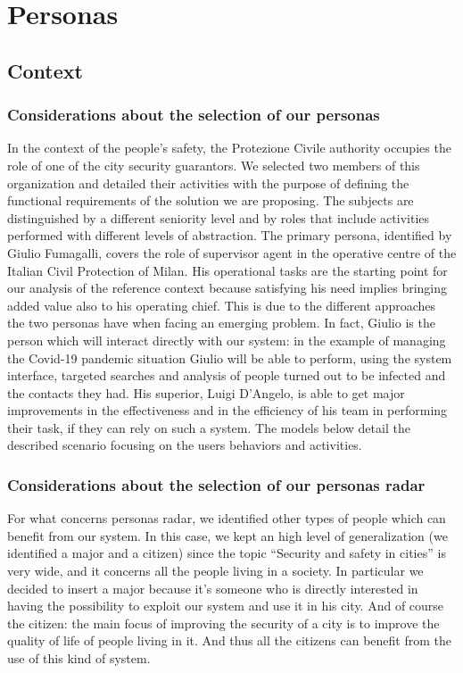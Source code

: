 \documentclass[../main.tex]{subfiles}
\begin{document}
    \chapter{Personas}\label{ch:topic}

    \section{Context}\label{sec:introduction}
    \subsection{Considerations about the selection of our personas}
    In the context of the people’s safety, the Protezione Civile authority occupies the role of one
    of the city security guarantors.
    We selected two members of this organization and detailed their activities with the purpose of
    defining the functional requirements of the solution we are proposing.
    The subjects are distinguished by a different seniority level and by roles that include activities
    performed with different levels of abstraction.
    The primary persona, identified by Giulio Fumagalli, covers the role of supervisor agent
    in the operative centre of the Italian Civil Protection of Milan.
    His operational tasks are the starting point for our analysis of the reference context because
    satisfying his need implies bringing added value also to his operating chief.
    This is due to the different approaches the two personas have when facing an emerging problem.
    In fact, Giulio is the person which will interact directly with our system: in the example of managing
    the Covid-19 pandemic situation Giulio will be able to perform, using the system interface,
    targeted searches and analysis of people turned out to be infected and the contacts they had.
    His superior, Luigi D’Angelo, is able to get major improvements in the effectiveness and in the
    efficiency of his team in performing their task, if they can rely on such a system.
    The models below detail the described scenario focusing on the users behaviors and activities.
    \subsection{Considerations about the selection of our personas radar}
    For what concerns personas radar, we identified other types of people which can benefit from our system.
    In this case, we kept an high level of generalization (we identified a major and a citizen) since
    the topic “Security and safety in cities” is very wide, and it concerns all the people living in a society.
    In particular we decided to insert a major because it’s someone who is directly interested in having the possibility to exploit our system and use it in his city.
    And of course the citizen: the main focus of improving the security of a city is to improve the quality of life of people living in it.
    And thus all the citizens can benefit from the use of this kind of system.
\end{document}
